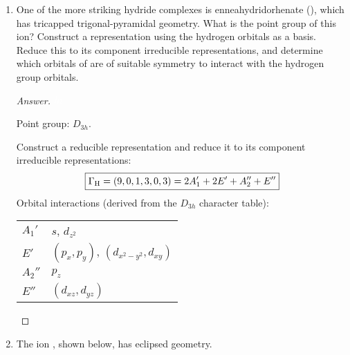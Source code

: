 \documentclass[../psets.tex]{subfiles}
\begin{document}
\begin{enumerate}[label={\Roman*)}]
\begin{enumerate}[label={\textbf{10.\arabic*}}]
\begin{proof}[Answer]
        \end{proof}
        \newpage
        \setcounter{enumii}{29}
        \item One of the more striking hydride complexes is enneahydridorhenate (), which has tricapped trigonal-pyramidal geometry. What is the point group of this ion? Construct a representation using the hydrogen orbitals as a basis. Reduce this to its component irreducible representations, and determine which orbitals of  are of suitable symmetry to interact with the hydrogen group orbitals.
        \begin{proof}[Answer]
            ${\color{white}hi}$
            \begin{center}
                \chemleft{[}
                \chemright{]^{2-}}
            \end{center}
            Point group: $\boxed{D_{3h}}$.\par
            Construct a reducible representation and reduce it to its component irreducible representations:
            \begin{equation*}
                \boxed{\Gamma_{\ce{H}} = (9,0,1,3,0,3) = 2A_1'+2E'+A_2''+E''}
            \end{equation*}
            Orbital interactions (derived from the $D_{3h}$ character table):
            \begin{center}
                \renewcommand{\arraystretch}{1.2}
                \begin{tabular}{|ll|}
                    \hline
                    $A_1'$ & $s$, $d_{z^2}$\\
                    $E'$ & $(p_x,p_y)$, $(d_{x^2-y^2},d_{xy})$\\
                    $A_2''$ & $p_z$\\
                    $E''$ & $(d_{xz},d_{yz})$\\
                    \hline
                \end{tabular}
            \end{center}
        \end{proof}
        \newpage
        \setcounter{enumii}{32}
        \item The ion , shown below, has eclipsed geometry.
        \begin{center}

\end{center}
\end{enumerate}
\end{enumerate}
\end{document}
